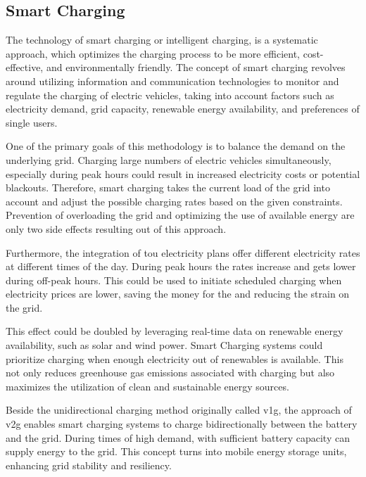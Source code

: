 \subsection{Smart Charging}
\label{ch:Introduction:sec:Electric Mobility:ssec:Smart Charging}

The technology of smart charging or intelligent charging, is a systematic approach, which optimizes the charging process to be more efficient, cost-effective, and environmentally friendly. The concept of smart charging revolves around utilizing information and communication technologies to monitor and regulate the charging of electric vehicles, taking into account factors such as electricity demand, grid capacity, renewable energy availability, and preferences of single users.

One of the primary goals of this methodology is to balance the demand on the underlying grid. Charging large numbers of electric vehicles simultaneously, especially during peak hours could result in increased electricity costs or potential blackouts. Therefore, smart charging takes the current load of the grid into account and adjust the possible charging rates based on the given constraints. Prevention of overloading the grid and optimizing the use of available energy are only two side effects resulting out of this approach. 

Furthermore, the integration of \acrfull{tou} electricity plans offer different electricity rates at different times of the day. During peak hours the rates increase and gets lower during off-peak hours. This could be used to initiate scheduled charging when electricity prices are lower, saving the money for the  and reducing the strain on the grid. 

This effect could be doubled by leveraging real-time data on renewable energy availability, such as solar and wind power. Smart Charging systems could prioritize charging when enough electricity out of renewables is available. This not only reduces greenhouse gas emissions associated with charging  but also maximizes the utilization of clean and sustainable energy sources.

Beside the unidirectional charging method originally called \acrfull{v1g}, the approach of \acrfull{v2g} enables smart charging systems to charge bidirectionally between the  battery and the grid. During times of high demand,  with sufficient battery capacity can supply energy to the grid. This concept turns  into mobile energy storage units, enhancing grid stability and resiliency.

